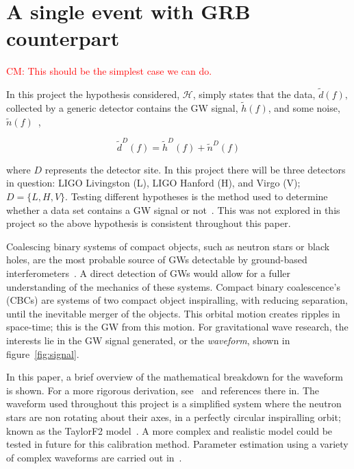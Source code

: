 \documentclass[12pt]{iopart}
\newcommand{\curlH}{\mathcal{H}}
\newcommand{\gws}{\tilde{h}}
\newcommand{\cm}[1]{\textcolor{red}{CM: #1}}
\begin{document}
\section{A single event with GRB counterpart\label{sec:single}}

\cm{This should be the simplest case we can do.}

In this project the hypothesis considered, $\curlH$, simply states that the
data, $\tilde{d}(f),$ collected by a generic detector contains the GW signal,
$\gws(f)$, and some noise, $\tilde{n}(f)$~\cite{JVei},

\begin{equation}
  \label{eq:data}
  \tilde{d}^D(f) = \gws^D(f) + \tilde{n}^D(f)
\end{equation}

where $D$ represents the detector site. In this project there will be three
detectors in question: LIGO Livingston (L), LIGO Hanford (H), and Virgo (V); $D
= \{L,H,V\}$. Testing different hypotheses is the method used to determine
whether a data set contains a GW signal or not~\cite{SathSchutz}. This was not
explored in this project so the above hypothesis is consistent throughout this
paper.

Coalescing binary systems of compact objects, such as neutron stars or black
holes, are the most probable source of GWs detectable by ground-based
interferometers~\cite{peadvanced}. A direct detection of GWs would allow for a
fuller understanding of the mechanics of these systems. Compact binary
coalescence's (CBCs) are systems of two compact object inspiralling, with
reducing separation, until the inevitable merger of the objects. This orbital
motion creates ripples in space-time; this is the GW from this motion. For
gravitational wave research, the interests lie in the GW signal generated, or
the \textit{waveform}, shown in figure~\ref{fig:signal}.

In this paper, a brief overview of the mathematical breakdown for the waveform
is shown. For a more rigorous derivation, see~\cite{SathSchutz} and references
there in. The waveform used throughout this project is a simplified system
where the neutron stars are non rotating about their axes, in a perfectly
circular inspiralling orbit; known as the TaylorF2 model~\cite{TF2,pN}. A more
complex and realistic model could be tested in future for this calibration
method. Parameter estimation using a variety of complex waveforms are carried
out in~\cite{peadvanced}.
\end{document}
